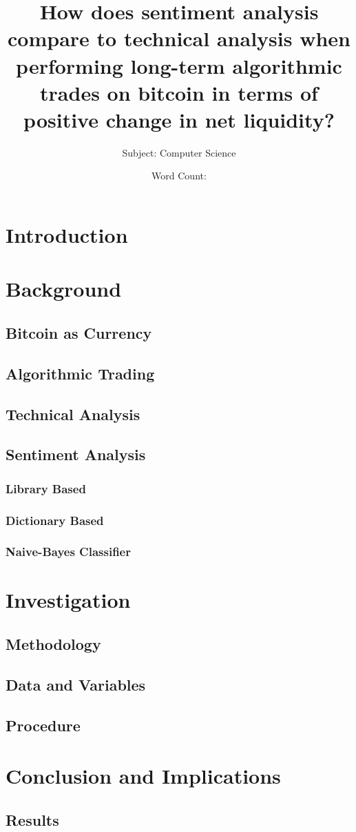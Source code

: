 \documentclass{article}
\title{How does sentiment analysis compare to technical analysis when performing long-term algorithmic trades on bitcoin in terms of positive change in net liquidity?}
\author{Subject: Computer Science}
\date{Word Count: }
\begin{document}
\maketitle
\newpage
\tableofcontents
\newpage
\section{Introduction}
\section{Background}
\subsection{Bitcoin as Currency}
\subsection{Algorithmic Trading}
\subsection{Technical Analysis}
\subsection{Sentiment Analysis}
\subsubsection{Library Based}
\subsubsection{Dictionary Based}
\subsubsection{Naive-Bayes Classifier}
\section{Investigation}
\subsection{Methodology}
\subsection{Data and Variables}
\subsection{Procedure}
\section{Conclusion and Implications}
\subsection{Results}
\end{document}
